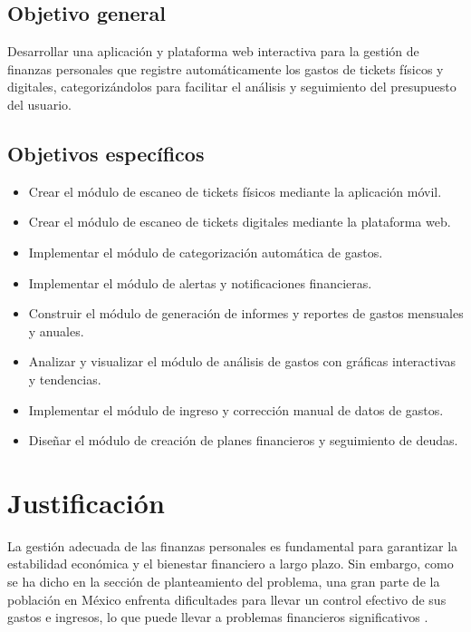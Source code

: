 \subsection{Objetivo general}
Desarrollar una aplicación y plataforma web interactiva para la gestión de finanzas personales que registre automáticamente los gastos de tickets físicos y digitales, 
categorizándolos para facilitar el análisis y seguimiento del presupuesto del usuario. 

\subsection{Objetivos específicos}
\begin{itemize}
    \item Crear el módulo de escaneo de tickets físicos mediante la aplicación móvil. 
    \item Crear el módulo de escaneo de tickets digitales mediante la plataforma web.
    \item Implementar el módulo de categorización automática de gastos. 
    \item Implementar el módulo de alertas y notificaciones financieras. 
    \item Construir el módulo de generación de informes y reportes de gastos mensuales y anuales. 
    \item Analizar y visualizar el módulo de análisis de gastos con gráficas interactivas y tendencias.
    \item Implementar el módulo de ingreso y corrección manual de datos de gastos.
    \item Diseñar el módulo de creación de planes financieros y seguimiento de deudas. 
\end{itemize}

\section{Justificación}
La gestión adecuada de las finanzas personales es fundamental para garantizar la estabilidad económica y el bienestar financiero a largo plazo. Sin embargo, como se ha dicho en 
la sección de planteamiento del problema, una gran parte de la población en México enfrenta dificultades para llevar un control efectivo de sus gastos e ingresos, lo que puede 
llevar a problemas financieros significativos \cite{inegi2024}.

